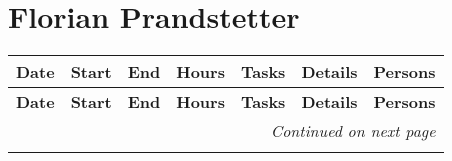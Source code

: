 


\section{Florian Prandstetter}

\renewcommand{\arraystretch}{1.3} %
\footnotesize
\begin{longtable}{@{}p{1.3cm} p{1cm} p{1cm} p{1cm} p{1.5cm} p{4.5cm} p{1.2cm}@{}}
    \toprule
    \textbf{Date} & \textbf{Start} & \textbf{End} & \textbf{Hours} & \textbf{Tasks} & \textbf{Details} & \textbf{Persons} \\
    \midrule
    \endfirsthead

    \toprule
    \textbf{Date} & \textbf{Start} & \textbf{End} & \textbf{Hours} & \textbf{Tasks} & \textbf{Details} & \textbf{Persons} \\
    \midrule
    \endhead

    \midrule
    \multicolumn{7}{r}{\textit{Continued on next page}} \\
    \midrule
    \endfoot

    \bottomrule
    \endlastfoot


\end{longtable}
